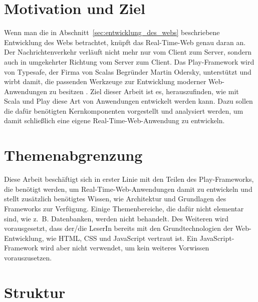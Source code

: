 

\section{Motivation und Ziel} %
\label{sec:motivation_und_ziel}

Wenn man die in Abschnitt~\ref{sec:entwicklung_des_webs} beschriebene Entwicklung des Webs betrachtet, knüpft das Real-Time-Web genau daran an.
Der Nachrichtenverkehr verläuft nicht mehr nur vom Client zum Server, sondern auch in umgekehrter Richtung vom Server zum Client.
Das Play-Framework wird von Typesafe, der Firma von Scalas Begründer Martin Odersky, unterstützt und wirbt damit, die passenden Werkzeuge zur Entwicklung moderner Web-Anwendungen zu besitzen \cite[vgl.][]{play}.
Ziel dieser Arbeit ist es, herauszufinden, wie mit Scala und Play diese Art von Anwendungen entwickelt werden kann.
Dazu sollen die dafür benötigten Kernkomponenten vorgestellt und analysiert werden, um damit schließlich eine eigene Real-Time-Web-Anwendung zu entwickeln.



\section{Themenabgrenzung} %
\label{sec:themenabgrenzung}

Diese Arbeit beschäftigt sich in erster Linie mit den Teilen des Play-Frameworks, die benötigt werden, um Real-Time-Web-Anwendungen damit zu entwickeln und stellt zusätzlich benötigtes Wissen, wie Architektur und Grundlagen des Frameworks zur Verfügung.
Einige Themenbereiche, die dafür nicht elementar sind, wie z.~B. Datenbanken, werden nicht behandelt.
Des Weiteren wird vorausgesetzt, dass der/die LeserIn bereits mit den Grundtechnologien der Web-Entwicklung, wie HTML, CSS und JavaScript vertraut ist.
Ein JavaScript-Framework wird aber nicht verwendet, um kein weiteres Vorwissen vorauszusetzen.



\section{Struktur} %
\label{sec:struktur}

